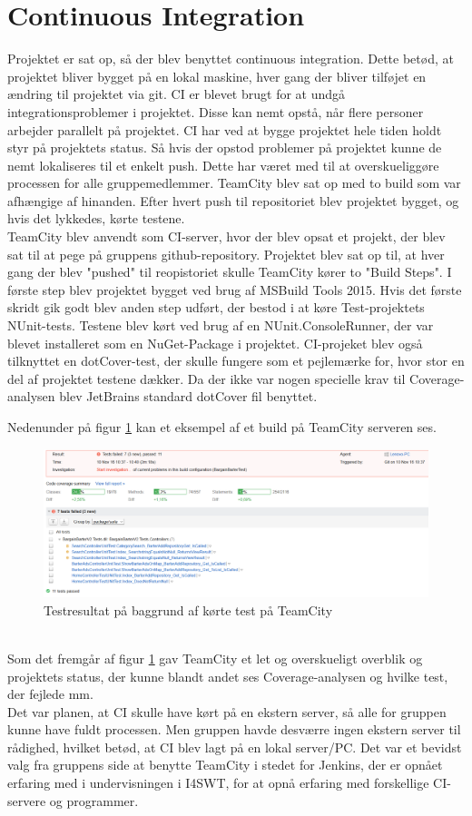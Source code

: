 \section{Continuous Integration}
Projektet er sat op, så der blev benyttet continuous integration. Dette betød, at projektet bliver bygget på en lokal maskine, hver gang der bliver tilføjet en ændring til projektet via git. CI er blevet brugt for at undgå integrationsproblemer i projektet. Disse kan nemt opstå, når flere personer arbejder parallelt på projektet. CI har ved at bygge projektet hele tiden holdt styr på projektets status. Så hvis der opstod problemer på projektet kunne de nemt lokaliseres til et enkelt push. Dette har været med til at overskueliggøre processen for alle gruppemedlemmer.
TeamCity blev sat op med to build som var afhængige af hinanden. Efter hvert push til repositoriet blev projektet bygget, og hvis det lykkedes, kørte testene. 
\\
\noindent TeamCity \cite{TeamCity} blev anvendt som CI-server, hvor der blev opsat et  projekt, der blev sat til at pege på gruppens github-repository. Projektet blev sat op til, at hver gang der blev "pushed" til reopistoriet skulle TeamCity kører to "Build Steps". I første step blev projektet bygget ved brug af MSBuild Tools 2015. Hvis det første skridt gik godt blev anden step udført, der bestod i at køre Test-projektets NUnit-tests. Testene blev kørt ved brug af en NUnit.ConsoleRunner, der var blevet installeret som en NuGet-Package i projektet.  
CI-projeket blev også tilknyttet en dotCover-test, der skulle fungere som et pejlemærke for, hvor stor en del af projektet testene dækker. Da der ikke var nogen specielle krav til Coverage-analysen blev JetBrains standard dotCover fil benyttet.

\noindent Nedenunder på figur \ref{fig:TeamCityTest} kan et eksempel af et build på TeamCity serveren ses. 
\begin{figure}[ht!]
	\centering
	\includegraphics[width=120mm]{figures/TeamCityTest.png}
	\caption{Testresultat på baggrund af kørte test på TeamCity}
	\label{fig:TeamCityTest}
\end{figure}
\\
Som det fremgår af figur \ref{fig:TeamCityTest} gav TeamCity et let og overskueligt overblik og projektets status, der kunne blandt andet ses Coverage-analysen og hvilke test, der fejlede mm.
\\
Det var planen, at CI skulle have kørt på en ekstern server, så alle for gruppen kunne have fuldt processen. Men gruppen havde desværre ingen ekstern server til rådighed, hvilket betød, at CI blev lagt på en lokal server/PC. Det var et bevidst valg fra gruppens side at benytte TeamCity i stedet for Jenkins, der er opnået erfaring med i undervisningen i I4SWT, for at opnå erfaring med forskellige CI-servere og programmer.